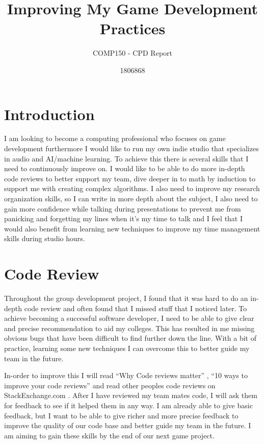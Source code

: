 \documentclass{scrartcl}
\title{Improving My Game Development Practices}
\subtitle{COMP150 - CPD Report}
\author{1806868}
\begin{document}
\maketitle

\section{Introduction}

I am looking to become a computing professional who focuses on game development furthermore I would like to run my own indie studio that specializes in audio and AI/machine learning. To achieve this there is several skills that I need to continuously improve on. I would like to be able to do more in-depth code reviews to better support my team, dive deeper in to math by induction to support me with creating complex algorithms. I also need to improve my research organization skills, so I can write in more depth about the subject, I also need to gain more confidence while talking during presentations to prevent me from panicking and forgetting my lines when it’s my time to talk and I feel that I would also benefit from learning new techniques to improve my time management skills during studio hours.

\section{Code Review}

Throughout the group development project, I found that it was hard to do an in-depth code review and often found that I missed stuff that I noticed later. To achieve becoming a successful software developer, I need to be able to give clear and precise recommendation to aid my colleges. This has resulted in me missing obvious bugs that have been difficult to find further down the line. With a bit of practice, learning some new techniques I can overcome this to better guide my team in the future. 

In-order to improve this I will read ``Why Code reviews matter'' \cite{codeReviewsMatter}, ``10 ways to improve your code reviews'' \cite{waysToImprove} and read other peoples code reviews on StackExchange.com \cite{stackexchange}. After I have reviewed my team mates code, I will ask them for feedback to see if it helped them in any way. I am already able to give basic feedback, but I want to be able to give richer and more precise feedback to improve the quality of our code base and better guide my team in the future. I am aiming to gain these skills by the end of our next game project.
\end{document}
